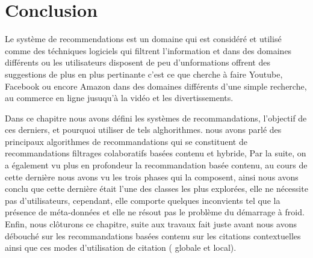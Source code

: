         
    
					

\section{Conclusion}
\par Le système de recommendations est un domaine qui est considéré et utilisé comme des téchniques logiciels qui filtrent l'information et dans des domaines différents ou les utilisateurs disposent de peu d'unformations offrent des suggestions de plus en plus pertinante c'est ce que cherche à faire Youtube, Facebook ou encore Amazon dans des domaines différents d'une simple recherche, au commerce en ligne jusuqu'à la vidéo et les divertissements.

\par Dans ce chapitre nous avons défini les systèmes de recommandations, l'objectif de ces derniers, et pourquoi utiliser de tels alghorithmes. nous avons parlé des principaux algorithmes de recommandations qui se constituent de recommandations filtrages colaboratifs basées contenu et hybride, Par la suite, on a également vu plus en profondeur la recommandation basée contenu, au cours de cette dernière nous avons vu les trois phases qui la composent, ainsi nous avons conclu que cette dernière était l'une des classes les plus explorées, elle ne nécessite pas d'utilisateurs, cependant, elle comporte quelques inconvients tel que la présence de méta-données et elle ne résout pas le problème du démarrage à froid. Enfin, nous clôturons ce chapitre, suite aux travaux fait juste avant nous avons débouché sur les recommandations basées contenu sur les citations contextuelles ainsi que ces modes d'utilisation de citation ( globale et local).


